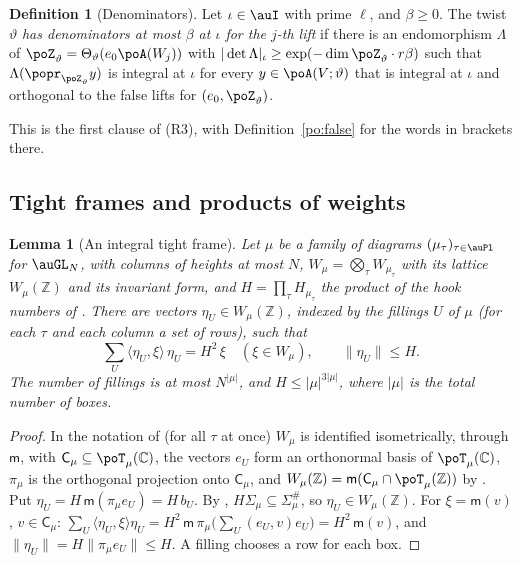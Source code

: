 \documentclass[10pt]{amsart}
\newtheorem{lemma}[theorem]{Lemma}
\theoremstyle{definition}
\newtheorem{definition}[theorem]{Definition}
\theoremstyle{remark}
\newcommand{\C}{\mathbb C}
\newcommand{\Z}{\mathbb Z}
\begin{document}
\begin{definition}[Denominators]\label{po:denom}
Let $\iota\in\auI$ with prime $\ell$, and $\beta\ge0$. The twist $\vartheta$ \emph{has
denominators at most $\beta$ at $\iota$ for the $j$-th lift} if there is an endomorphism $\Lambda$
of $\poZ_\vartheta=\Theta_\vartheta(e_0\poA(W_j))$ with $|\det\Lambda|_\iota\ge\exp(-\dim
\poZ_\vartheta\cdot r\beta)$ such that $\Lambda(\popr_{\poZ_\vartheta}y)$ is integral at $\iota$
for every $y\in\poA(V;\vartheta)$ that is integral at $\iota$ and orthogonal to the false lifts
for $(e_0,\poZ_\vartheta)$.
\end{definition}

This is the first clause of (R3), with Definition~\ref{po:false} for the words in brackets there.

\subsection{Tight frames and products of weights}\label{po:ss-frame}

\begin{lemma}[An integral tight frame]\label{po:frame}
Let $\mu$ be a family of diagrams $(\mu_\tau)_{\tau\in\auPl}$ for $\auGL_N$, with columns of
heights at most $N$, $W_\mu=\bigotimes_\tau W_{\mu_\tau}$ with its lattice $W_\mu(\Z)$ and its
invariant form, and $H=\prod_\tau H_{\mu_\tau}$ the product of the hook numbers of
{\cite[Lemma~5.22]{P49}}. There are vectors $\eta_U\in W_\mu(\Z)$, indexed by the fillings $U$ of $\mu$
(for each $\tau$ and each column a set of rows), such that
\[
\sum_U\langle\eta_U,\xi\rangle\,\eta_U=H^2\,\xi\quad(\xi\in W_\mu),\qquad\|\eta_U\|\le H .
\]
The number of fillings is at most $N^{|\mu|}$, and $H\le|\mu|^{3|\mu|}$, where $|\mu|$ is the
total number of boxes.
\end{lemma}
\begin{proof}
In the notation of {\cite[\S5.2.6]{P49}} (for all $\tau$ at once) $W_\mu$ is identified
isometrically, through $\mathsf m$, with $\mathsf C_\mu\subseteq\poT_\mu(\C)$, the vectors $e_U$
form an orthonormal basis of $\poT_\mu(\C)$, $\pi_\mu$ is the orthogonal projection onto
$\mathsf C_\mu$, and $W_\mu(\Z)=\mathsf m(\mathsf C_\mu\cap\poT_\mu(\Z))$ by {\cite[(51)]{P49}}.
Put $\eta_U=H\,\mathsf m(\pi_\mu e_U)=H\,b_U$. By {\cite[Lemma~5.22]{P49}}, $H\Sigma_\mu\subseteq
\Sigma_\mu^\#$, so $\eta_U\in W_\mu(\Z)$. For $\xi=\mathsf m(v)$, $v\in\mathsf C_\mu$:
$\sum_U\langle\eta_U,\xi\rangle\eta_U=H^2\,\mathsf m\,\pi_\mu\bigl(\sum_U(e_U,v)e_U\bigr)=H^2\,
\mathsf m(v)$, and $\|\eta_U\|=H\|\pi_\mu e_U\|\le H$. A filling chooses a row for each box.
\end{proof}
\end{document}
